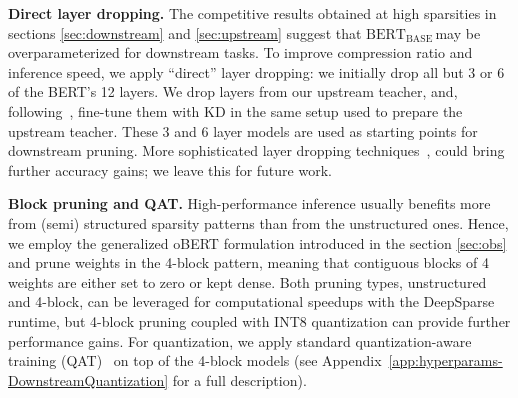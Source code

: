 \documentclass[11pt]{article}
\newcommand{\bert}{$\textrm{BERT}_{\textrm{BASE}}\,$}
\begin{document}
\noindent\textbf{Direct layer dropping.} The competitive results obtained at high sparsities in sections \ref{sec:downstream} and \ref{sec:upstream} suggest that \bert may be overparameterized for downstream tasks. To improve compression ratio and inference speed, we apply ``direct'' layer dropping: we initially drop all but 3 or 6 of the BERT's 12 layers. We drop layers from our upstream teacher, and, following~\cite{Turc2019WellReadSL}, fine-tune them with KD in the same setup used to prepare the upstream teacher. These 3 and 6 layer models are used as starting points for downstream pruning. More sophisticated layer dropping techniques~\cite{fan2019reducing}, could bring further accuracy gains; we leave this for future work.

\noindent\textbf{Block pruning and QAT.} High-performance inference usually benefits more from (semi) structured sparsity patterns than from the unstructured ones. Hence, we employ the generalized oBERT formulation introduced in the section \ref{sec:obs} and prune weights in the 4-block pattern, meaning that contiguous blocks of 4 weights are either set to zero or kept dense. Both pruning types, unstructured and 4-block, can be leveraged for computational speedups with the DeepSparse runtime, but 4-block pruning coupled with INT8 quantization can provide further performance gains. For quantization, we apply standard quantization-aware training (QAT)~\cite{jacob2018quantization} on top of the 4-block models (see Appendix~\ref{app:hyperparams-DownstreamQuantization} for a full description).
\end{document}
